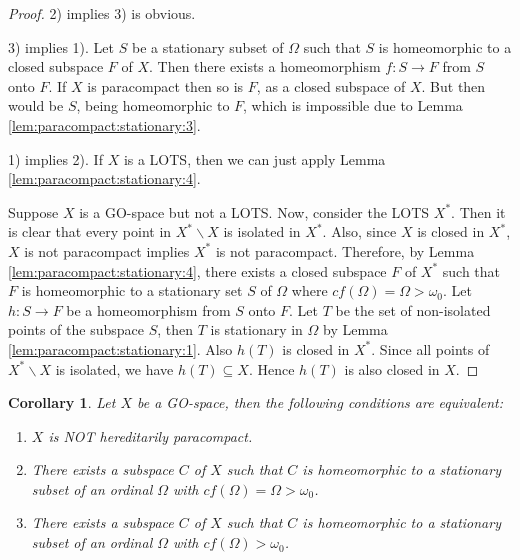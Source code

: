 \documentclass[12pt,oneside,english]{amsbook}
\numberwithin{equation}{section} %
\numberwithin{figure}{section} %
\theoremstyle{plain}
\numberwithin{section}{chapter}
\theoremstyle{plain}
\newtheorem{corollary}[thm]{Corollary}
\begin{document}
\begin{proof}
  
  2) implies 3) is obvious.

  3) implies 1). Let $S$ be a stationary subset of $\Omega$ such that $S$ is homeomorphic to a closed subspace $F$ of $X$. Then there exists a homeomorphism $f:S \to F$ from $S$ onto $F$. If $X$ is paracompact then so is $F$, as a closed subspace of $X$. But then would be $S$, being homeomorphic to $F$, which is impossible due to Lemma \ref{lem:paracompact:stationary:3}. 

  1) implies 2). If $X$ is a LOTS, then we can just apply Lemma \ref{lem:paracompact:stationary:4}.

  Suppose $X$ is a GO-space but not a LOTS. Now, consider the LOTS $X^{*}$. Then it is clear that every point in $X^* \backslash X$ is isolated in $X^*$. Also, since $X$ is closed in $X^*$, $X$ is not paracompact implies $X^*$ is not paracompact. Therefore, by Lemma \ref{lem:paracompact:stationary:4}, there exists a closed subspace $F$ of $X^*$ such that $F$ is homeomorphic to a stationary set $S$ of $\Omega$ where $cf(\Omega) = \Omega > \omega_0 $. Let $h: S \to F$ be a homeomorphism from $S$ onto $F$. Let $T$ be the set of non-isolated points of the subspace $S$, then $T$ is stationary in $\Omega$ by Lemma \ref{lem:paracompact:stationary:1}. Also $h(T)$ is closed in $X^*$. Since all points of $X^* \backslash X$ is isolated, we have $h(T) \subseteq X$. Hence $h(T)$ is also closed in $X$. 
\end{proof}

\begin{corollary}
  Let $X$ be a GO-space, then the following conditions are equivalent:
  \begin{enumerate}
  \item $X$ is NOT hereditarily paracompact.
  \item There exists a subspace $C$ of $X$ such that $C$ is homeomorphic to a stationary subset of an ordinal $\Omega$ with $cf(\Omega) = \Omega > \omega_0$.
  \item There exists a subspace $C$ of $X$ such that $C$ is homeomorphic to a stationary subset of an ordinal $\Omega$ with $cf(\Omega) > \omega_0$.
  \end{enumerate}
\end{corollary}
\end{document}
